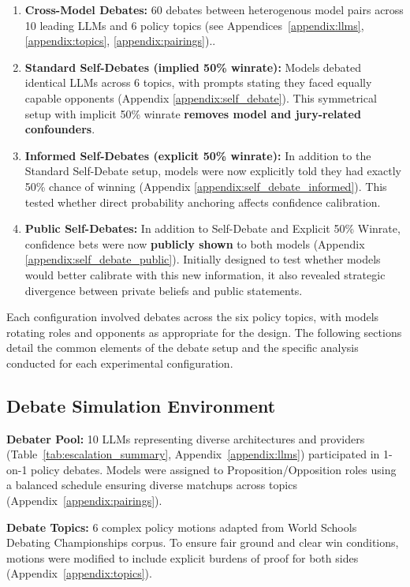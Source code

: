 \documentclass{article}
\begin{document}
\begin{enumerate}    
    \item \textbf{Cross-Model Debates:} 60 debates between heterogenous model pairs across 10 leading LLMs and 6 policy topics (see Appendices~\ref{appendix:llms}, \ref{appendix:topics}, \ref{appendix:pairings})..

    \item \textbf{Standard Self-Debates (implied 50\% winrate):} Models debated identical LLMs across 6 topics, with prompts stating they faced equally capable opponents (Appendix \ref{appendix:self_debate}). This symmetrical setup with implicit 50\% winrate \textbf{removes model and jury-related confounders}.

    \item \textbf{Informed Self-Debates (explicit 50\% winrate):} In addition to the Standard Self-Debate setup, models were now explicitly told they had exactly 50\% chance of winning (Appendix \ref{appendix:self_debate_informed}). This tested whether direct probability anchoring affects confidence calibration.

    \item \textbf{Public Self-Debates:} In addition to Self-Debate and Explicit 50\% Winrate, confidence bets were now \textbf{publicly shown} to both models (Appendix \ref{appendix:self_debate_public}). Initially designed to test whether models would better calibrate with this new information, it also revealed strategic divergence between private beliefs and public statements.
\end{enumerate}
Each configuration involved debates across the six policy topics, with models rotating roles and opponents as appropriate for the design. The following sections detail the common elements of the debate setup and the specific analysis conducted for each experimental configuration.

\subsection{Debate Simulation Environment}
\label{subsec:debate_env}

\textbf{Debater Pool:} 10 LLMs representing diverse architectures and providers (Table~\ref{tab:escalation_summary}, Appendix~\ref{appendix:llms}) participated in 1-on-1 policy debates. Models were assigned to Proposition/Opposition roles using a balanced schedule ensuring diverse matchups across topics (Appendix~\ref{appendix:pairings}).

\textbf{Debate Topics:} 6 complex policy motions adapted from World Schools Debating Championships corpus. To ensure fair ground and clear win conditions, motions were modified to include explicit burdens of proof for both sides (Appendix~\ref{appendix:topics}).
\end{document}
